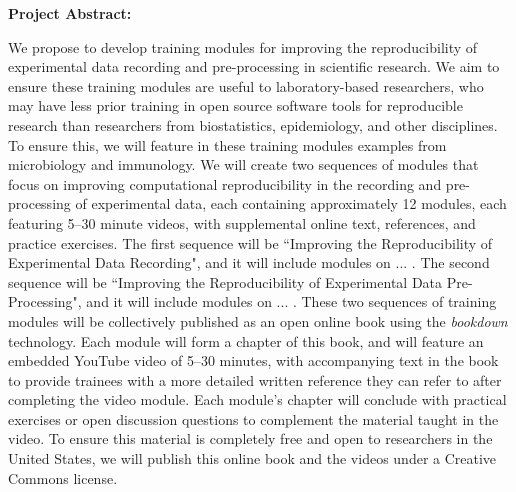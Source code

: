 \documentclass[pdftex,english,11pt,parskip=half]{scrartcl}
\begin{document}
\def\bf{\normalfont\bfseries}
\pagestyle{empty}

{\large \textbf{Project Abstract:}}

We propose to develop training modules for improving the reproducibility of experimental data recording and pre-processing in scientific research. We aim to ensure these training modules are useful to laboratory-based researchers, who may have less prior training in open source software tools for reproducible research than researchers from biostatistics, epidemiology, and other disciplines. To ensure this, we will feature in these training modules examples from microbiology and immunology. We will create two sequences of modules that focus on improving computational reproducibility in the recording and pre-processing of experimental data, each containing approximately 12 modules, each featuring 5--30 minute videos, with supplemental online text, references, and practice exercises. The first sequence will be ``Improving the Reproducibility of Experimental Data Recording", and it will include modules on ... . The second sequence will be ``Improving the Reproducibility of Experimental Data Pre-Processing", and it will include modules on ... . These two sequences of training modules will be collectively published as an open online book using the \textit{bookdown} technology. Each module will form a chapter of this book, and will feature an embedded YouTube video of 5--30 minutes, with accompanying text in the book to provide trainees with a more detailed written reference they can refer to after completing the video module. Each module's chapter will conclude with practical exercises or open discussion questions to complement the material taught in the video. To ensure this material is completely free and open to researchers in the United States, we will publish this online book and the videos under a Creative Commons license.
\end{document}
